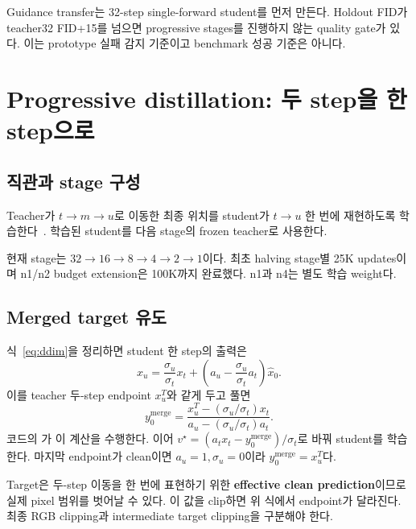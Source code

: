 \documentclass[11pt,a4paper]{article}
\newcommand{\code}[1]{\texttt{\detokenize{#1}}}
\begin{document}
Guidance transfer는 32-step single-forward student를 먼저 만든다. Holdout FID가 teacher32 FID+15를 넘으면 progressive stages를 진행하지 않는 quality gate가 있다. 이는 prototype 실패 감지 기준이고 benchmark 성공 기준은 아니다.

\section{Progressive distillation: 두 step을 한 step으로}
\subsection{직관과 stage 구성}
Teacher가 $t\to m\to u$로 이동한 최종 위치를 student가 $t\to u$ 한 번에 재현하도록 학습한다~\cite{progressive}. 학습된 student를 다음 stage의 frozen teacher로 사용한다.
\begin{center}
\end{center}
현재 stage는 $32\to16\to8\to4\to2\to1$이다. 최초 halving stage별 25K updates이며 n1/n2 budget extension은 100K까지 완료했다. n1과 n4는 별도 학습 weight다.

\subsection{Merged target 유도}
식~\eqref{eq:ddim}을 정리하면 student 한 step의 출력은
\[
x_u=\frac{\sigma_u}{\sigma_t}x_t+
\left(a_u-\frac{\sigma_u}{\sigma_t}a_t\right)\hat x_0.
\]
이를 teacher 두-step endpoint $x_u^T$와 같게 두고 풀면
\begin{equation}
\boxed{y_0^{\mathrm{merge}}=
\frac{x_u^T-(\sigma_u/\sigma_t)x_t}{a_u-(\sigma_u/\sigma_t)a_t}}.
\end{equation}
코드의 \code{merged_target()}가 이 계산을 수행한다. 이어 $v^\star=(a_t x_t-y_0^{\mathrm{merge}})/\sigma_t$로 바꿔 student를 학습한다. 마지막 endpoint가 clean이면 $a_u=1,\sigma_u=0$이라 $y_0^{\mathrm{merge}}=x_u^T$다.

Target은 두-step 이동을 한 번에 표현하기 위한 \textbf{effective clean prediction}이므로 실제 pixel 범위를 벗어날 수 있다. 이 값을 clip하면 위 식에서 endpoint가 달라진다. 최종 RGB clipping과 intermediate target clipping을 구분해야 한다.
\end{document}
